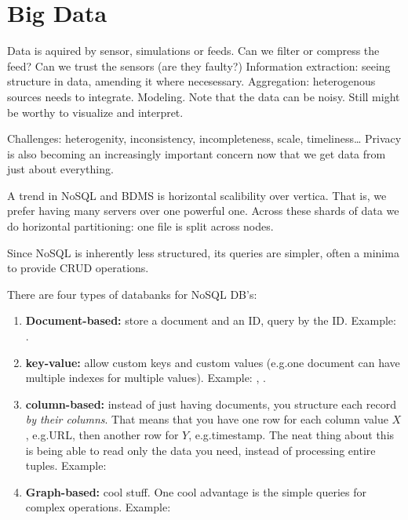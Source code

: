 \section{Big Data}
Data is aquired by sensor, simulations or feeds. Can we filter or compress the feed?
Can we trust the sensors (are they faulty?)
Information extraction: seeing structure in data, amending it where necesessary.
Aggregation: heterogenous sources needs to integrate.
Modeling. Note that the data can be noisy. Still might be worthy to visualize and interpret.

Challenges: heterogenity, inconsistency, incompleteness, scale, timeliness\dots
Privacy is also becoming an increasingly important concern now that we get data from just about everything.

A trend in NoSQL and BDMS is horizontal scalibility over vertica. That is, we prefer having many 
servers over one powerful one. Across these shards of data we do horizontal partitioning: one file is 
split across nodes.

Since NoSQL is inherently less structured, its queries are simpler, often a minima to provide CRUD operations. 

There are four types of databanks for NoSQL DB's:
\begin{enumerate}
    \item \textbf{Document-based:} store a document and an ID, query by the ID.
        \newline Example: .
    \item \textbf{key-value:} allow custom keys and custom values (e.g.\@ one document can have multiple indexes for multiple values).
        \newline Example: , .
    \item \textbf{column-based:} instead of just having documents, you structure each record \textit{by their columns}. That means that you have one row for each column value $X$, e.g.\@ URL, then another row for $Y$, e.g.\@ timestamp. The neat thing about this is being able to read only the data you need, instead of processing
        entire tuples.
        \newline Example: 
    \item \textbf{Graph-based:} cool stuff. One cool advantage is the simple queries for complex operations.
        \newline Example: 
\end{enumerate}


